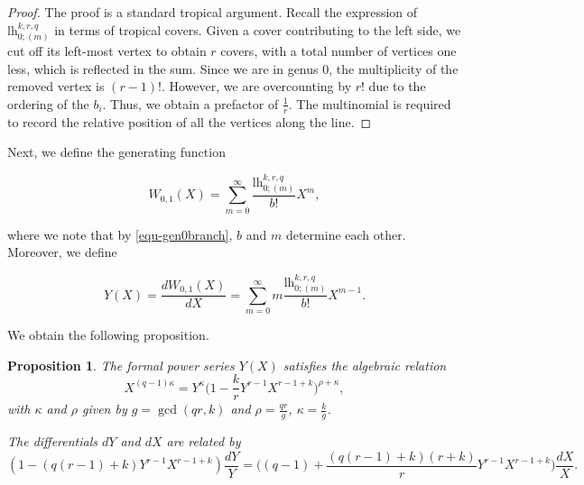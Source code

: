 \documentclass[10pt,a4paper,oneside,no-math,reqno]{amsart}%
\theoremstyle{plain}
\newtheorem{proposition}[theorem]{Proposition}
\theoremstyle{definition}
\theoremstyle{remark}
\numberwithin{equation}{section}
\newcommand{\1}{\mathds{1}}
\newcommand{\<}{\langle}
\renewcommand{\>}{\rangle}
\newcommand{\lh}{\mathord{\mathrm{l\!h}}}
\begin{document}
\begin{proof}
	The proof is a standard tropical argument. Recall the expression of $\lh^{k,r,q}_{0;(m)}$ in terms of tropical covers.  Given a cover contributing to the left side, we cut off its left-most vertex to obtain $r$ covers, with a total number of vertices one less, which is reflected in the sum. Since we are in genus $0$, the multiplicity of the removed vertex is $(r-1)!$. However, we are overcounting by $r!$ due to the ordering of the $b_i$. Thus, we obtain a prefactor of $\frac{1}{r}$. The multinomial is required to record the relative position of all the vertices along the line.
\end{proof}

Next, we define the generating function

\begin{equation}
    W_{0,1}(X)
    =
    \sum_{m=0}^\infty\frac{\lh^{k,r,q}_{0;(m)}}{b!}X^m,
\end{equation}

where we note that by \cref{equ-gen0branch}, $b$ and $m$ determine each other. Moreover, we define

\begin{equation}
    Y(X)=\frac{dW_{0,1}(X)}{dX}
    =
    \sum_{m=0}^\infty m\frac{\lh^{k,r,q}_{0;(m)}}{b!}X^{m-1}.
\end{equation}

We obtain the following proposition.

\begin{proposition}
\label{prop-01spectral}
	The formal power series $Y(X)$ satisfies the algebraic relation
	\begin{equation}\label{SpectralCurve}
		X^{(q-1) \kappa}
        =
        Y^\kappa \big( 1 - \frac{k}{r} Y^{r-1} X^{r-1+k} \big)^{\rho + \kappa} ,
	\end{equation}
	with $ \kappa $ and $ \rho$ given by $ g = \gcd (qr, k) $ and $ \rho = \frac{qr}{g}$, $ \kappa = \frac{k}{g}$.\par
	The differentials $ dY$ and $ dX$ are related by
	\begin{equation}\label{DiffEqFory}
		(1 - (q(r-1)+k)Y^{r-1} X^{r-1+k} ) \frac{dY}{Y}
        =
        \Big( (q-1) + \frac{(q(r-1)+k)(r+k)}{r} Y^{r-1} X^{r-1+k} \Big) \frac{dX}{X}.
	\end{equation}
\end{proposition}
\end{document}
